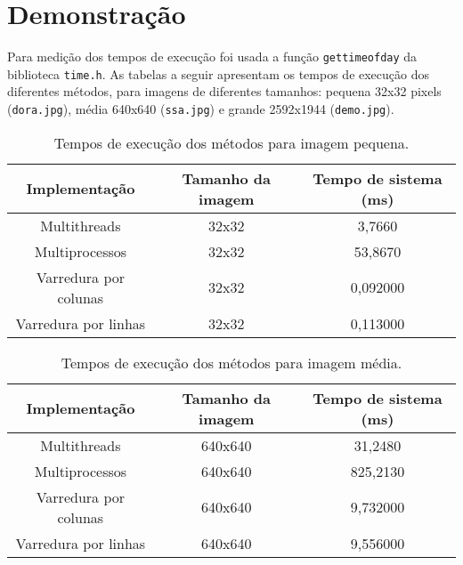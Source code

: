 \documentclass[a4paper, 10pt, conference]{ieeeconf}
\begin{document}
\section{Demonstração}


Para medição dos tempos de execução foi usada a função \texttt{gettimeofday} da biblioteca \texttt{time.h}. As tabelas a seguir apresentam os tempos de execução dos diferentes métodos, para imagens de diferentes tamanhos: pequena 32x32 pixels (\texttt{dora.jpg}), média 640x640 (\texttt{ssa.jpg}) e grande 2592x1944 (\texttt{demo.jpg}).

\begin{table}[h]
	\centering
	\caption{Tempos de execução dos métodos para imagem pequena.}
	\label{tabela2}
	\begin{tabular}{|c|c|c|}
		\hline
		\textbf{Implementação} & \textbf{Tamanho da imagem} & \textbf{Tempo de sistema (ms)} \\ \hline
		Multithreads           & 32x32                      & 3,7660                         \\ \hline
		Multiprocessos         & 32x32                      & 53,8670                        \\ \hline
		Varredura por colunas  & 32x32                      & 0,092000                       \\ \hline
		Varredura por linhas   & 32x32                      & 0,113000                       \\ \hline
	\end{tabular}
\end{table}

\begin{table}[h]
	\centering
	\caption{Tempos de execução dos métodos para imagem média.}
	\label{tabela3}
	\begin{tabular}{|c|c|c|}
		\hline
		\textbf{Implementação} & \textbf{Tamanho da imagem} & \textbf{Tempo de sistema (ms)} \\ \hline
		Multithreads           & 640x640                    & 31,2480                        \\ \hline
		Multiprocessos         & 640x640                    & 825,2130                       \\ \hline
		Varredura por colunas  & 640x640                    & 9,732000                       \\ \hline
		Varredura por linhas   & 640x640                    & 9,556000                       \\ \hline
	\end{tabular}
\end{table}
\end{document}
